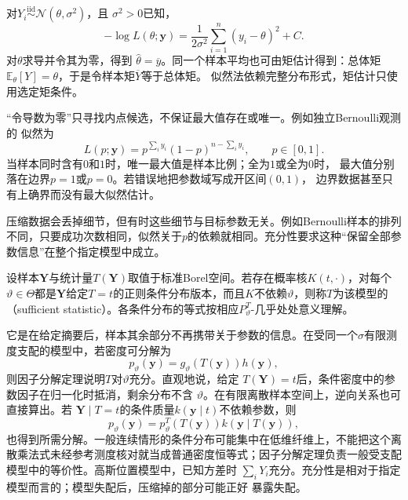 对\(Y_i\overset{\mathrm{iid}}{\sim}\mathcal{N}(\theta,\sigma^2)\)，且
\(\sigma^2>0\)已知，
\[
  -\log L(\theta;\bm{y})
  =\frac{1}{2\sigma^2}\sum_{i=1}^n(y_i-\theta)^2+C.
\]
对\(\theta\)求导并令其为零，得到
\(\widehat\theta=\overline y\)。同一个样本平均也可由矩估计得到：总体矩
\(\mathbb{E}_\theta[Y]=\theta\)，于是令样本矩\(\overline Y\)等于总体矩。
似然法依赖完整分布形式，矩估计只使用选定矩条件。

“令导数为零”只寻找内点候选，不保证最大值存在或唯一。例如独立Bernoulli观测的
似然为
\[
  L(p;\bm y)=p^{\sum_i y_i}(1-p)^{n-\sum_i y_i},\qquad p\in[0,1].
\]
当样本同时含有\(0\)和\(1\)时，唯一最大值是样本比例；全为\(1\)或全为\(0\)时，
最大值分别落在边界\(p=1\)或\(p=0\)。若错误地把参数域写成开区间\((0,1)\)，
边界数据甚至只有上确界而没有最大似然估计。

压缩数据会丢掉细节，但有时这些细节与目标参数无关。例如Bernoulli样本的排列不同，只要成功次数相同，似然关于\(p\)的依赖就相同。充分性要求这种“保留全部参数信息”在整个指定模型中成立。
\begin{definition}[充分统计量]
  \label{def:statistics-sufficient-statistic}
  设样本\(\bm Y\)与统计量\(T(\bm Y)\)取值于标准Borel空间。若存在概率核\(K(t,\cdot)\)，对每个\(\vartheta\in\Theta\)都是\(\bm Y\)给定\(T=t\)的正则条件分布版本，而且\(K\)不依赖\(\vartheta\)，则称\(T\)为该模型的（sufficient statistic）。各条件分布的等式按相应\(P_\vartheta^T\)-几乎处处意义理解。
\end{definition}
它是在给定摘要后，样本其余部分不再携带关于参数的信息。在受同一个\(\sigma\)有限测度支配的模型中，若密度可分解为
\[
  p_\vartheta(\bm y)=g_\vartheta(T(\bm y))h(\bm y),
\]
则因子分解定理说明\(T\)对\(\vartheta\)充分。直观地说，给定
\(T(\bm Y)=t\)后，条件密度中的参数因子在归一化时抵消，剩余分布不含
\(\vartheta\)。在有限离散样本空间上，逆向关系也可直接算出。若
\(\bm Y\mid T=t\)的条件质量\(k(\bm y\mid t)\)不依赖参数，则
\[
  p_\vartheta(\bm y)
  =p_\vartheta^T(T(\bm y))k(\bm y\mid T(\bm y)),
\]
也得到所需分解。一般连续情形的条件分布可能集中在低维纤维上，不能把这个离散乘法式未经参考测度核对就当成普通密度恒等式；因子分解定理负责一般受支配模型中的等价性。高斯位置模型中，已知方差时
\(\sum_iY_i\)充分。充分性是相对于指定模型而言的；模型失配后，压缩掉的部分可能正好
暴露失配。

